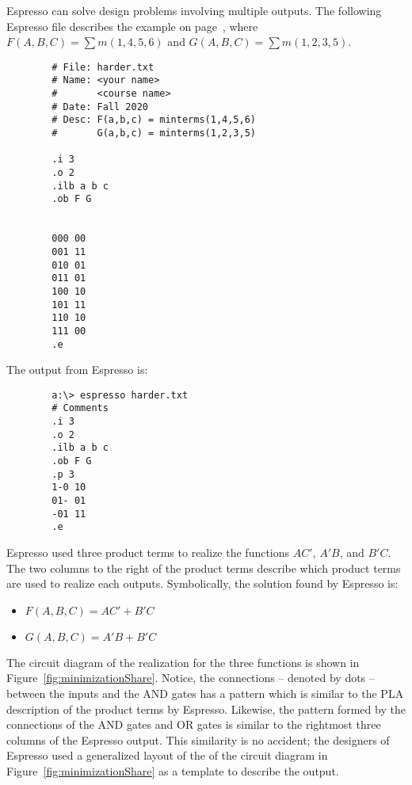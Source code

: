 Espresso can solve design problems involving multiple outputs. The
following Espresso file describes the example on 
page~\pageref{page:DualFnc}, where 
$F(A,B,C) = \sum m(1,4,5,6)$ and $G(A,B,C) = \sum m(1,2,3,5)$.  

\begin{verbatim}
        # File: harder.txt
        # Name: <your name>
        #       <course name>
        # Date: Fall 2020
        # Desc: F(a,b,c) = minterms(1,4,5,6)
        #       G(a,b,c) = minterms(1,2,3,5)
        
        .i 3
        .o 2
        .ilb a b c
        .ob F G
        
        
        000 00
        001 11
        010 01
        011 01
        100 10
        101 11
        110 10
        111 00
        .e
\end{verbatim}

The output from Espresso is:
\begin{verbatim}
        a:\> espresso harder.txt 
        # Comments
        .i 3
        .o 2
        .ilb a b c
        .ob F G
        .p 3
        1-0 10
        01- 01
        -01 11
        .e
\end{verbatim}

Espresso used three product terms to realize the functions $AC'$, $A'B$,
and $B'C$.  The two columns to the right of the product terms 
describe which product terms are used to realize each outputs. 
Symbolically, the solution found by Espresso is:
\begin{itemize}
\item $F(A,B,C)= AC' + B'C$
\item $G(A,B,C)= A'B + B'C $
\end{itemize}

The circuit diagram of the realization for the three functions is
shown in Figure~\ref{fig:minimizationShare}.  Notice, the connections --
denoted by dots -- between the inputs and the AND gates has a pattern
which is similar to the PLA description of the product terms by
Espresso.  Likewise, the pattern formed by the connections of the AND
gates and OR gates is similar to the rightmost three columns of the
Espresso output.  This similarity is no accident; the designers of Espresso 
used a generalized layout of the of the circuit diagram in 
Figure~\ref{fig:minimizationShare} as a template to describe the output.


